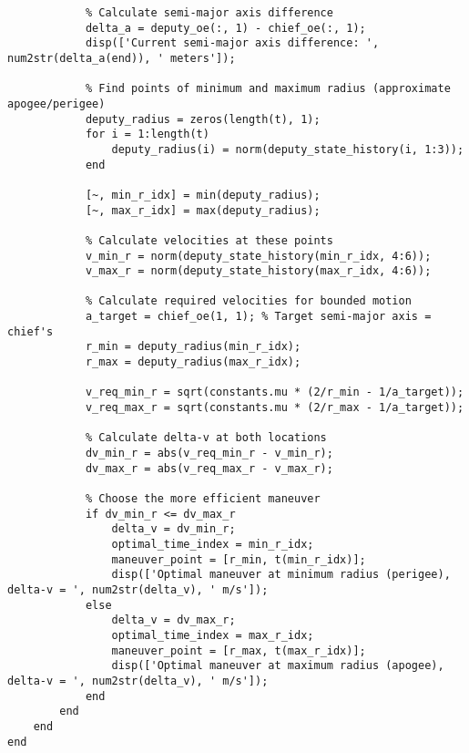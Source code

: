 \begin{lstlisting}
            % Calculate semi-major axis difference
            delta_a = deputy_oe(:, 1) - chief_oe(:, 1);
            disp(['Current semi-major axis difference: ', num2str(delta_a(end)), ' meters']);
            
            % Find points of minimum and maximum radius (approximate apogee/perigee)
            deputy_radius = zeros(length(t), 1);
            for i = 1:length(t)
                deputy_radius(i) = norm(deputy_state_history(i, 1:3));
            end
            
            [~, min_r_idx] = min(deputy_radius);
            [~, max_r_idx] = max(deputy_radius);
            
            % Calculate velocities at these points
            v_min_r = norm(deputy_state_history(min_r_idx, 4:6));
            v_max_r = norm(deputy_state_history(max_r_idx, 4:6));
            
            % Calculate required velocities for bounded motion
            a_target = chief_oe(1, 1); % Target semi-major axis = chief's
            r_min = deputy_radius(min_r_idx);
            r_max = deputy_radius(max_r_idx);
            
            v_req_min_r = sqrt(constants.mu * (2/r_min - 1/a_target));
            v_req_max_r = sqrt(constants.mu * (2/r_max - 1/a_target));
            
            % Calculate delta-v at both locations
            dv_min_r = abs(v_req_min_r - v_min_r);
            dv_max_r = abs(v_req_max_r - v_max_r);
            
            % Choose the more efficient maneuver
            if dv_min_r <= dv_max_r
                delta_v = dv_min_r;
                optimal_time_index = min_r_idx;
                maneuver_point = [r_min, t(min_r_idx)];
                disp(['Optimal maneuver at minimum radius (perigee), delta-v = ', num2str(delta_v), ' m/s']);
            else
                delta_v = dv_max_r;
                optimal_time_index = max_r_idx;
                maneuver_point = [r_max, t(max_r_idx)];
                disp(['Optimal maneuver at maximum radius (apogee), delta-v = ', num2str(delta_v), ' m/s']);
            end
        end
    end
end
\end{lstlisting}

